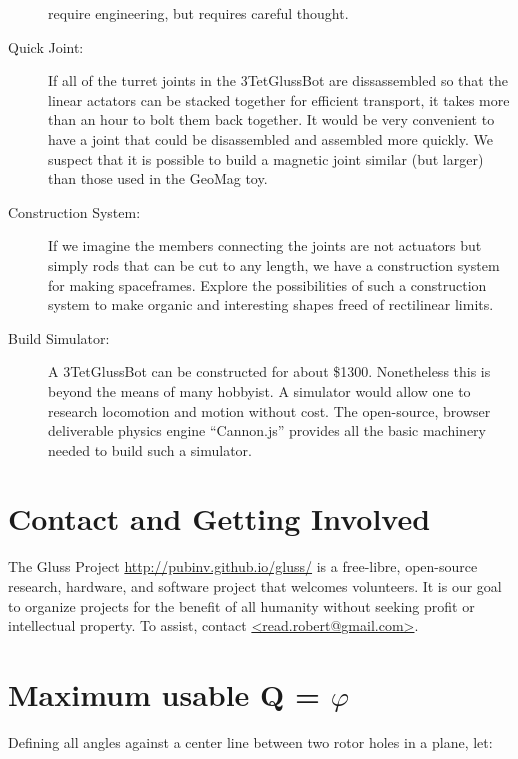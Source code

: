 \documentclass[12pt]{article}
\begin{document}
\begin{description}
  require engineering, but requires careful thought.
\item [Quick Joint:] If all of the turret joints in the 3TetGlussBot are dissassembled so that
  the linear actators can be stacked together for efficient transport, it takes more than an hour
  to bolt them back together. It would be very convenient to have a joint that could be
  disassembled and assembled more quickly. We suspect that it is possible to build a magnetic
  joint similar (but larger) than those used in the GeoMag toy.
\item [Construction System:] If we imagine the members connecting the joints are not actuators but
  simply rods that can be cut to any length, we have a construction system for making spaceframes.
  Explore the possibilities of such a construction system to make organic and interesting shapes
  freed of rectilinear limits.
\item [Build Simulator:] A 3TetGlussBot can be constructed for about \$1300. Nonetheless this
  is beyond the means of many hobbyist. A simulator would allow one to research locomotion and
  motion without cost. The open-source, browser deliverable physics engine ``Cannon.js''
  provides all the basic machinery needed to build such a simulator.
\end{description}


\section{Contact and Getting Involved}

The Gluss Project \href{http://pubinv.github.io/gluss/}{http://pubinv.github.io/gluss/}
is a free-libre, open-source research, hardware, and software project that welcomes volunteers.
It is our goal to organize projects for the benefit of all humanity without seeking profit or intellectual property.
To assist, contact \href{mailto:read.robert@gmail.com}{<read.robert@gmail.com>}.




\newpage
\appendix

\label{phiproof}

\section{Maximum usable Q = $\varphi$}

Defining all angles against a center line between two rotor holes in a plane,
let:
\end{document}
